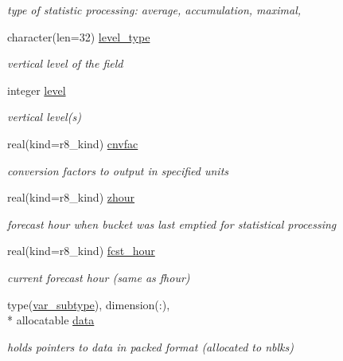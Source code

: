 \begin{DoxyCompactItemize}
\begin{DoxyCompactList}\small\item\em type of statistic processing\-: average, accumulation, maximal, \end{DoxyCompactList}\item 
character(len=32) \hyperlink{structdycore__typedefs_1_1dycore__diag__type_a5c500119b8307feb96268bf4b45a3d90}{level\-\_\-type}
\begin{DoxyCompactList}\small\item\em vertical level of the field \end{DoxyCompactList}\item 
integer \hyperlink{structdycore__typedefs_1_1dycore__diag__type_ac5a325a7f34fb5df278e141ddd62a283}{level}
\begin{DoxyCompactList}\small\item\em vertical level(s) \end{DoxyCompactList}\item 
real(kind=r8\-\_\-kind) \hyperlink{structdycore__typedefs_1_1dycore__diag__type_ae35b7d0f8874805074bb1e02e05628ac}{cnvfac}
\begin{DoxyCompactList}\small\item\em conversion factors to output in specified units \end{DoxyCompactList}\item 
real(kind=r8\-\_\-kind) \hyperlink{structdycore__typedefs_1_1dycore__diag__type_a2fd3a19561d5756ba91a8ca4d7f07986}{zhour}
\begin{DoxyCompactList}\small\item\em forecast hour when bucket was last emptied for statistical processing \end{DoxyCompactList}\item 
real(kind=r8\-\_\-kind) \hyperlink{structdycore__typedefs_1_1dycore__diag__type_a857feb4213b48ce81b3d295561b92058}{fcst\-\_\-hour}
\begin{DoxyCompactList}\small\item\em current forecast hour (same as fhour) \end{DoxyCompactList}\item 
type(\hyperlink{structdycore__typedefs_1_1var__subtype}{var\-\_\-subtype}), dimension(\-:), \\*
allocatable \hyperlink{structdycore__typedefs_1_1dycore__diag__type_affdbdddebd40e81618410f1312a49c5b}{data}
\begin{DoxyCompactList}\small\item\em holds pointers to data in packed format (allocated to nblks) \end{DoxyCompactList}\end{DoxyCompactItemize}


